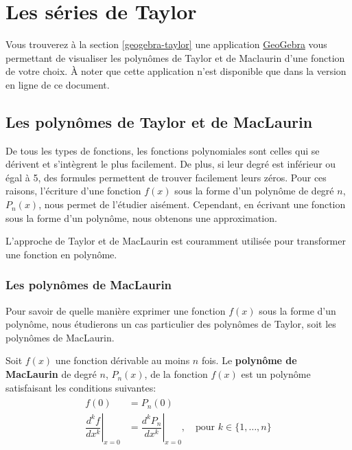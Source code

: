 \documentclass[]{book}
\theoremstyle{definition}
\theoremstyle{definition}
\theoremstyle{definition}
\theoremstyle{remark}
\let\BeginKnitrBlock\begin \let\EndKnitrBlock\end
\begin{document}
\hypertarget{taylor}{%
\chapter{Les séries de Taylor}\label{taylor}}

Vous trouverez à la section \ref{geogebra-taylor} une application
\href{https://www.geogebra.org/?lang=fr}{GeoGebra} vous permettant de
visualiser les polynômes de Taylor et de Maclaurin d'une fonction de
votre choix. À noter que cette application n'est disponible que dans la
version en ligne de ce document.

\hypertarget{les-polynomes-de-taylor-et-de-maclaurin}{%
\section{Les polynômes de Taylor et de
MacLaurin}\label{les-polynomes-de-taylor-et-de-maclaurin}}

De tous les types de fonctions, les fonctions polynomiales sont celles
qui se dérivent et s'intègrent le plus facilement. De plus, si leur
degré est inférieur ou égal à 5, des formules permettent de trouver
facilement leurs zéros. Pour ces raisons, l'écriture d'une fonction
\(f(x)\) sous la forme d'un polynôme de degré \(n\), \(P_n(x)\), nous
permet de l'étudier aisément. Cependant, en écrivant une fonction sous
la forme d'un polynôme, nous obtenons une approximation.

L'approche de Taylor et de MacLaurin est couramment utilisée pour
transformer une fonction en polynôme.

\hypertarget{les-polynomes-de-maclaurin}{%
\subsection{Les polynômes de
MacLaurin}\label{les-polynomes-de-maclaurin}}

Pour savoir de quelle manière exprimer une fonction \(f(x)\) sous la
forme d'un polynôme, nous étudierons un cas particulier des polynômes de
Taylor, soit les polynômes de MacLaurin.

\BeginKnitrBlock{definition}[Polynôme de Maclaurin]
\protect\hypertarget{def:unnamed-chunk-1}{}{\label{def:unnamed-chunk-1}
{} }Soit \(f(x)\) une fonction
dérivable au moins \(n\) fois. Le \textbf{polynôme de MacLaurin} de
degré \(n\), \(P_n(x)\), de la fonction \(f(x)\) est un polynôme
satisfaisant les conditions suivantes: \begin{align}
\begin{split}
f(0) &= P_n(0) \\
\left.\dfrac{d^k f}{dx^k}\right|_{x=0} &= \left.\dfrac{d^k P_n}{dx^k}\right|_{x=0}, \quad \text{pour } k\in\{1,\ldots,n\}
\end{split}
\end{align}
\EndKnitrBlock{definition}
\end{document}
